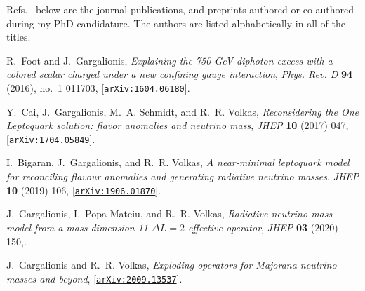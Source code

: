\begin{publications}
 
  \begin{flushleft}
    Refs.~\cite{Foot:2016llc, Cai:2017wry, Bigaran:2019bqv, Gargalionis:2019drk,
      Gargalionis:2020xvt} below are the journal publications, and preprints
    authored or co-authored during my PhD candidature. The authors are listed
    alphabetically in all of the titles.
  \end{flushleft}

  \journalpaperlist
  \begin{enumerate}[label={[\arabic*]}]
    \item R.~Foot and J.~Gargalionis, {\it {Explaining the 750 GeV diphoton
        excess with a colored scalar charged under a new confining gauge
        interaction}}, {\em Phys. Rev. D} {\bf 94} (2016), no.~1 011703,
    [\href{http://arxiv.org/abs/1604.06180}{{\tt arXiv:1604.06180}}].

    \item Y.~Cai, J.~Gargalionis, M.~A. Schmidt, and R.~R. Volkas, {\it
      {Reconsidering the One Leptoquark solution: flavor anomalies and neutrino
        mass}}, {\em JHEP} {\bf 10} (2017) 047,
    [\href{http://arxiv.org/abs/1704.05849}{{\tt arXiv:1704.05849}}].

    \item I.~Bigaran, J.~Gargalionis, and R.~R. Volkas, {\it {A near-minimal leptoquark
        model for reconciling flavour anomalies and generating radiative neutrino
        masses}},  {\em JHEP} {\bf 10} (2019) 106,
    [\href{http://arxiv.org/abs/1906.01870}{{\tt arXiv:1906.01870}}].

    \item J.~Gargalionis, I.~Popa-Mateiu, and R.~R. Volkas, {\it {Radiative
        neutrino mass model from a mass dimension-11 $\Delta L =2 $ effective
        operator}}, {\em JHEP} {\bf 03} (2020) 150,.

    \item J.~Gargalionis and R.~R. Volkas, {\it {Exploding operators for
      Majorana neutrino masses and beyond}},
      [\href{http://arxiv.org/abs/2009.13537}{{\tt arXiv:2009.13537}}].
  \end{enumerate}
\end{publications}

